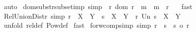 \begin{isabellebody}
%
\isadelimproof
%
\endisadelimproof
%
\isatagproof
{}\isamarkupfalse%
\ auto\isanewline
{}\isamarkupfalse%
%
\endisatagproof
{\isafoldproof}%
%
\isadelimproof
\isanewline
%
\endisadelimproof
\isanewline
{}\isamarkupfalse%
\ dom{\isacharunderscore}substr{\isacharunderscore}subset{\isacharunderscore}imp\ {\isacharbrackleft}simp{\isacharbrackright}{\isacharcolon}\ {\isachardoublequoteopen}{\isacharbang}{\isacharbang}\ r{\isachardot}\ {\isacharparenleft}{\isacharparenleft}dom\ r{\isacharparenright}\ {\isacharless}{\isacharequal}\ m{\isacharparenright}\ {\isacharequal}{\isacharequal}{\isachargreater}\ {\isacharparenleft}{\isacharparenleft}m\ {\isacharless}{\isacharminus}{\isacharcolon}\ r{\isacharparenright}\ {\isacharequal}\ {\isacharbraceleft}{\isacharbraceright}{\isacharparenright}{\isachardoublequoteclose}\isanewline
%
\isadelimproof
%
\endisadelimproof
%
\isatagproof
{}\isamarkupfalse%
\ fast\isanewline
{}\isamarkupfalse%
%
\endisatagproof
{\isafoldproof}%
%
\isadelimproof
%
\endisadelimproof
%
\isamarkuptrue%
\isamarkupfalse%
\ Rel{\isacharunderscore}Union{\isacharunderscore}Distr\ {\isacharbrackleft}simp{\isacharbrackright}{\isacharcolon}\ {\isachardoublequoteopen}{\isacharparenleft}r\ {\isacharcolon}\ {\isacharparenleft}X\ {\isacharless}{\isacharminus}{\isacharminus}{\isachargreater}\ Y{\isacharparenright}\ {\isacharampersand}\ s\ {\isacharcolon}\ {\isacharparenleft}X\ {\isacharless}{\isacharminus}{\isacharminus}{\isachargreater}\ Y{\isacharparenright}{\isacharparenright}\ {\isacharequal}\ {\isacharparenleft}r\ Un\ s\ {\isacharcolon}\ {\isacharparenleft}X\ {\isacharless}{\isacharminus}{\isacharminus}{\isachargreater}\ Y{\isacharparenright}{\isacharparenright}{\isachardoublequoteclose}\isanewline
%
\isadelimproof
%
\endisadelimproof
%
\isatagproof
{}\isamarkupfalse%
\ {\isacharparenleft}unfold\ rel{\isacharunderscore}def\ Pow{\isacharunderscore}def{\isacharparenright}\isanewline
{}\isamarkupfalse%
\ fast\isanewline
{}\isamarkupfalse%
%
\endisatagproof
{\isafoldproof}%
%
\isadelimproof
%
\endisadelimproof
%
\isamarkuptrue%
\isamarkupfalse%
\ forw{\isacharunderscore}comp{\isacharunderscore}simp\ {\isacharbrackleft}simp{\isacharbrackright}{\isacharcolon}\ {\isachardoublequoteopen}{\isacharparenleft}r\ {\isacharpercent}{\isacharsemicolon}\ s{\isacharparenright}\ {\isacharequal}\ {\isacharparenleft}s\ {\isacharpercent}o\ r{\isacharparenright}{\isachardoublequoteclose}\isanewline

\end{isabellebody}

